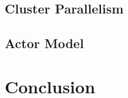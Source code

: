 \documentclass[12pt]{article}
\begin{document}
	\subsection{Cluster Parallelism}			\label{sec:mpi}				
	\subsection{Actor Model}				\label{sec:actorModel}			
\newpage

\section{Conclusion}						\label{sec:conclusion}			
\newpage



\end{document}
